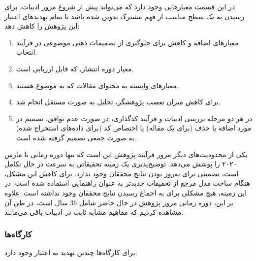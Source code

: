 در این قسمت معیار‌هایی وجود دارد که می‌تواند پیش از شروع مرور ادبیات، برای رسیدن
به یک سطح مناسب از فهم مشترک تدوین شده باشد تا تمام تهدید‌های اعتبار این پژوهش
را کاهش دهد:

\begin{enumerate}
    \item معیارهای اضافه و کاهش برای جلوگیری از تصمیمات ذهنی موضوعی در فرآیند
    انتخاب.
    \item معیار دوره انتشار، که قابل ارزیابی است.
    \item معیارهای وابسته به محتوای مقالات که به موضوع هستند.
    \item برای کاهش میزان تعصب پژوهشگر، تحلیل به صورت مستقل انجام شد.
    \item در هر دو مرحله بررسی ادبیات و فرآیند کدگذاری، در صورت عدم توافق، تصمیم
    در مورد اضافه یا حذف (برای یک مقاله) یا اختصاص کد (برای داده‌های استخراج
    شده) به صورت جمعی تصمیم گرفته شده است.
\end{enumerate}

یکی از محدودیت‌های دیگر مرور فرآیند پژوهش این است که تنها دوره زمانی تا مارس
۲۰۲۰ را پوشش می‌دهد. توضیح‌پذیری یک زمینه تحقیقاتی به سرعت در حال تکامل است،
تضمینی برای به‌روز بودن نتایج محققان وجود ندارد. برای کاهش این مشکل، هنگام ساخت
مدل مرجع از تحقیقات جدیدتر به عنوان راهنمایی استفاده شده است. در این زمینه، هیچ
مشکلی برای به اجماع رسیدن نتایج محققان وجود نداشته است. علاوه بر این، دوره زمانی
مرور پژوهش در حال حاضر شامل 36 سال است، در طی آن مشاهده کردیم که مفاهیم مشابه
ثابت در ادبیات باقی می‌مانند.

\subsubsection{کارگاه‌ها}

برای کارگاه‌ها چندین تهدید به اعتبار وجود دارد:

